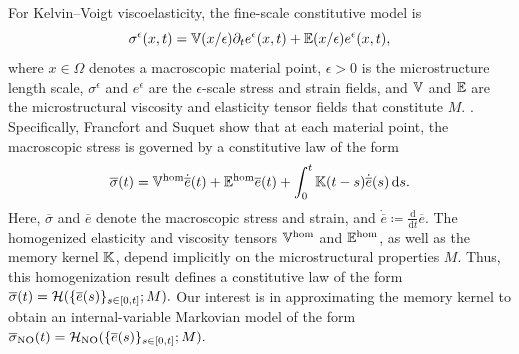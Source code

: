 \documentclass[3p, 12pt, preprint]{elsarticle}
\begin{document}
For Kelvin--Voigt viscoelasticity, the fine-scale constitutive model is
\begin{equation} \label{eq:sigma}
    \sigma^{\epsilon}(x,t) = \mathbb{V}(x/\epsilon)\partial_t e^{\epsilon}(x,t) + \mathbb{E}(x/\epsilon)e^{\epsilon}(x,t),
\end{equation}
where $x\in\Omega$ denotes a macroscopic material point, $\epsilon>0$ is the microstructure length scale, $\sigma^{\epsilon}$ and $e^{\epsilon}$ are the $\epsilon$-scale stress and strain fields, and $\mathbb{V}$ and $\mathbb{E}$ are the microstructural viscosity and elasticity tensor fields that constitute $M$.  \cite{coleman1960an,coleman1961foundations,tartar1990memory,ortiz2026linear}. Specifically, Francfort and Suquet \cite{francfort1986homogenization} show that at each material point, the macroscopic stress is governed by a constitutive law of the form
\begin{equation}
\label{eq:otf}
    \overline{\sigma}(t) = \mathbb{V}^{\rm hom}\dot{\overline{e}}(t) + \mathbb{E}^{\rm hom}\overline{e}(t) + \int_{0}^t \mathbb{K}(t-s)\dot{\overline{e}}(s)\,\mathrm{d}s.
\end{equation}
Here, $\overline{\sigma}$ and $\overline{e}$ denote the macroscopic stress and strain, and $\dot{\overline{e}}\coloneqq\frac{\mathrm{d}}{\mathrm{d}t}\overline{e}$. The homogenized elasticity and viscosity tensors $\mathbb{V}^{\rm hom}$ and $\mathbb{E}^{\rm hom}$, as well as the memory kernel $\mathbb{K}$, depend implicitly on the microstructural properties $M$. Thus, this homogenization result defines a constitutive law of the form
$\overline{\sigma}(t) = {\mathcal{H}}(\{\overline{e}(s)\}_{s\in[0,t]}; M).$ Our interest is in approximating the memory
kernel to obtain an internal-variable Markovian model of the form
$\overline{\sigma}_{\rm NO}(t) = {\mathcal{H}}_{\mathrm{NO}}(\{\overline{e}(s)\}_{s\in[0,t]}; M).$

\end{document}
